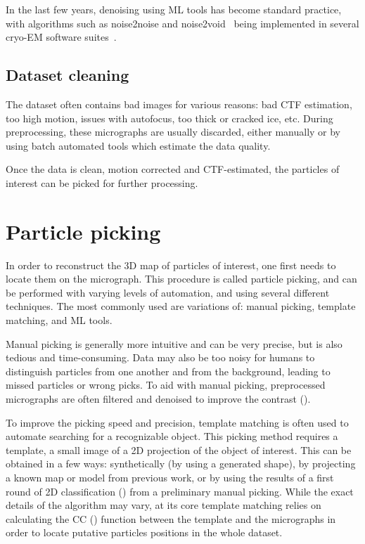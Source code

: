 In the last few years, denoising using ML tools has become standard practice, with algorithms such as noise2noise and noise2void~\cite{lehtinenNoise2NoiseLearningImage2018,krullNoise2VoidLearningDenoising2019} being implemented in several cryo-EM software suites~\cite{beplerTopazDenoiseGeneralDeep2020,tegunovRealtimeCryoelectronMicroscopy2019,buchholzCryoCAREContentAwareImage2018}.

\subsection{Dataset cleaning}
The dataset often contains bad images for various reasons: bad CTF estimation, too high motion, issues with autofocus, too thick or cracked ice, etc.
During preprocessing, these micrographs are usually discarded, either manually or by using batch automated tools which estimate the data quality.

Once the data is clean, motion corrected and CTF-estimated, the particles of interest can be picked for further processing.

\section{Particle picking}\label{em_particle_picking}
In order to reconstruct the 3D map of particles of interest, one first needs to locate them on the micrograph.
This procedure is called particle picking, and can be performed with varying levels of automation, and using several different techniques.
The most commonly used are variations of: manual picking, template matching, and ML tools.

Manual picking is generally more intuitive and can be very precise, but is also tedious and time-consuming.
Data may also be too noisy for humans to distinguish particles from one another and from the background, leading to missed particles or wrong picks.
To aid with manual picking, preprocessed micrographs are often filtered and denoised to improve the contrast ().

To improve the picking speed and precision, template matching is often used to automate searching for a recognizable object.
This picking method requires a template, a small image of a 2D projection of the object of interest.
This can be obtained in a few ways: synthetically (by using a generated shape), by projecting a known map or model from previous work, or by using the results of a first round of 2D classification () from a preliminary manual picking.
While the exact details of the algorithm may vary, at its core template matching relies on calculating the CC () function between the template and the micrographs in order to locate putative particles positions in the whole dataset.

